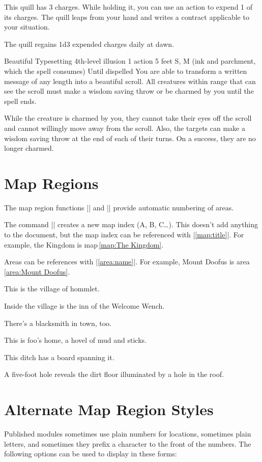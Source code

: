 \documentclass[letterpaper,twocolumn,openany,fancy,nodeprecatedcode]{dndbook}
\begin{document}
This quill has 3 charges. While holding it, you can use an action to expend 1 of its charges. The quill leaps from your hand and writes a contract applicable to your situation.

The quill regains 1d3 expended charges daily at dawn.

\DndSpellHeader%
  {Beautiful Typesetting}
  {4th-level illusion}
  {1 action}
  {5 feet}
  {S, M (ink and parchment, which the spell consumes)}
  {Until dispelled}
You are able to transform a written message of any length into a beautiful scroll. All creatures within range that can see the scroll must make a wisdom saving throw or be charmed by you until the spell ends.

While the creature is charmed by you, they cannot take their eyes off the scroll and cannot willingly move away from the scroll. Also, the targets can make a wisdom saving throw at the end of each of their turns. On a success, they are no longer charmed.

\section{Map Regions}
The map region functions |\DndArea| and |\DndSubArea| provide automatic numbering of areas.

The command || creates a new map index (A, B, C\ldots). This doesn't add anything to the document, but the map index can be referenced with |\ref{map:title}|. For example, the Kingdom is map\,\ref{map:The Kingdom}.


Areas can be references with |\ref{area:name}|. For example, Mount Doofus is area \ref{area:Mount Doofus}.

This is the village of hommlet.

Inside the village is the inn of the Welcome Wench.

There's a blacksmith in town, too.

This is foo's home, a hovel of mud and sticks.

This ditch has a board spanning it.

A five-foot hole reveals the dirt floor illuminated by a hole in the roof.

\section{Alternate Map Region Styles}
Published modules sometimes use plain numbers for locations, sometimes plain
letters, and sometimes they prefix a character to the front of the numbers.
The following options can be used to display in these forms:
\end{document}
